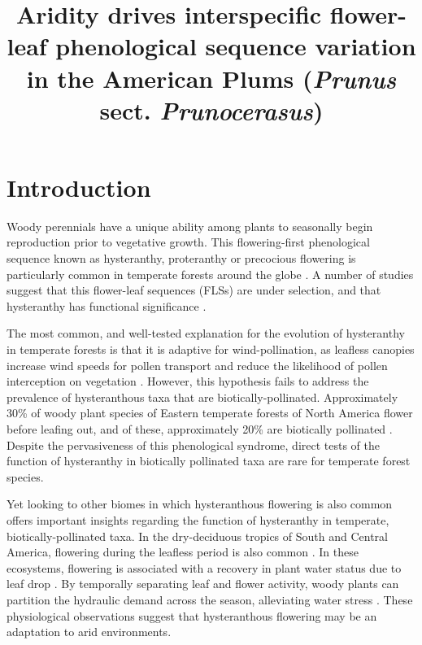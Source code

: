 \documentclass{article}[11pt]
\title{Aridity drives interspecific flower-leaf phenological sequence variation in the American Plums (\textit{Prunus} sect. \textit{Prunocerasus})}
\begin{document}

\maketitle


\section*{Introduction}

\noindent Woody perennials have a unique ability among plants to seasonally begin reproduction prior to vegetative growth. This flowering-first phenological sequence known as hysteranthy, proteranthy or precocious flowering is particularly common in temperate forests around the globe \citep{Rathcke_1985}. A number of studies suggest that this flower-leaf sequences (FLSs) are under selection, and that hysteranthy has functional significance \citep{Gougherty2018,Buonaiuto2020,Guo2014}.

\noindent The most common, and well-tested explanation for the evolution of hysteranthy in temperate forests is that it is adaptive for wind-pollination, as leafless canopies increase wind speeds for pollen transport and reduce the likelihood of pollen interception on vegetation \citep{Whitehead1969,Niklas1985}. However, this hypothesis fails to address the prevalence of hysteranthous taxa that are biotically-pollinated. Approximately 30\% of woody plant species of Eastern temperate forests of North America flower before leafing out, and of these, approximately 20\% are biotically pollinated  \citep{Buonaiuto2020}. Despite the pervasiveness of this phenological syndrome, direct tests of the function of hysteranthy in biotically pollinated taxa are rare for temperate forest species.

Yet looking to other biomes in which hysteranthous flowering is also common offers important insights regarding the function of hysteranthy in temperate, biotically-pollinated taxa. In the dry-deciduous tropics of South and Central America, flowering during the leafless period is also common \citep{Rathcke_1985,Franklin2016}. In these ecosystems, flowering is associated with a recovery in plant water status due to leaf drop \citep{Borchert1983,Reich1984}. By temporally separating leaf and flower activity, woody plants can partition the hydraulic demand across the season, alleviating water stress \citep{Gougherty2018,Franklin2016}. These physiological observations suggest that hysteranthous flowering may be an adaptation to arid environments.
\end{document}
